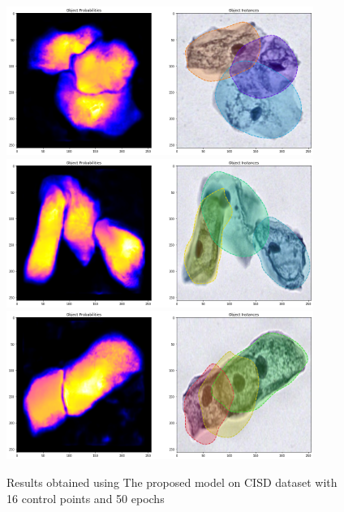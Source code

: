 \documentclass[main.tex]{subfiles}
\begin{document}
\begin{figure}[H]
    \centering
    \includegraphics[width=10cm]{images/CISD_result1.png}
    \includegraphics[width=10cm]{images/CISD_result2.png}
    \includegraphics[width=10cm]{images/CISD_result3.png}
    \caption{Results obtained using The proposed model on CISD dataset with 16 control points and 50 epochs}
\end{figure}
\end{document}
